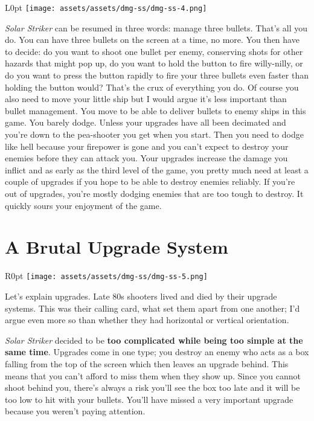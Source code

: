 \documentclass{book}
\begin{document}
\begin{wrapfigure}{L}{0pt} \texttt{[image: assets/assets/dmg-ss/dmg-ss-4.png]}\end{wrapfigure}
\emph{Solar Striker} can be resumed in three words: manage three bullets. That’s all you do. You can have three bullets on the screen at a time, no more. You then have to decide: do you want to shoot one bullet per enemy, conserving shots for other hazards that might pop up, do you want to hold the button to fire willy-nilly, or do you want to press the button rapidly to fire your three bullets even faster than holding the button would? That’s the crux of everything you do. Of course you also need to move your little ship but I would argue it’s less important than bullet management. You move to be able to deliver bullets to enemy ships in this game. You barely dodge. Unless your upgrades have all been decimated and you’re down to the pea-shooter you get when you start. Then you need to dodge like hell because your firepower is gone and you can’t expect to destroy your enemies before they can attack you. Your upgrades increase the damage you inflict and as early as the third level of the game, you pretty much need at least a couple of upgrades if you hope to be able to destroy enemies reliably. If you’re out of upgrades, you’re mostly dodging enemies that are too tough to destroy. It quickly sours your enjoyment of the game.

\FloatBarrier\needspace{5pt}\section*{A Brutal Upgrade System}\nopagebreak[4]

\begin{wrapfigure}{R}{0pt} \texttt{[image: assets/assets/dmg-ss/dmg-ss-5.png]}\end{wrapfigure}
Let’s explain upgrades. Late 80s shooters lived and died by their upgrade systems. This was their calling card, what set them apart from one another; I’d argue even more so than whether they had horizontal or vertical orientation.

\emph{Solar Striker} decided to be \textbf{too complicated while being too simple at the same time}. Upgrades come in one type; you destroy an enemy who acts as a box falling from the top of the screen which then leaves an upgrade behind. This means that you can’t afford to miss them when they show up. Since you cannot shoot behind you, there’s always a risk you’ll see the box too late and it will be too low to hit with your bullets. You’ll have missed a very important upgrade because you weren’t paying attention.
\end{document}
